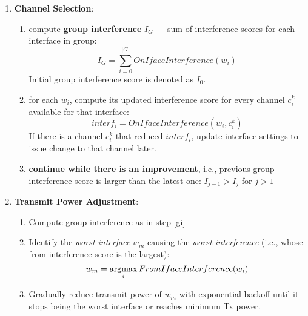 \begin{enumerate}
\item \textbf{Channel Selection}:
    \begin{enumerate}
        \item \label{gi} compute \textbf{group interference} $I_{G}$ --- sum of interference scores for each interface in group:
            \begin{equation}
                I_{G} = \sum_{i=0}^{\lvert G \rvert} OnIfaceInterference(w_i)
            \end{equation}
        Initial group interference score is denoted as $I_{0}$.
        \item for each $w_i$, compute its updated interference score for every channel $c^k_i$ available for that interface:
            \begin{equation}
                interf_i = OnIfaceInterference(w_i, c^k_i)
            \end{equation}
        If there is a channel $c^k_i$ that reduced $interf_i$, update interface settings to issue change to that channel later.
        \item \textbf{continue while there is an improvement}, i.e., previous group interference score is larger than the latest one:
        $I_{j-1} > I_{j}$ for $j > 1$
    \end{enumerate}
\item \textbf{Transmit Power Adjustment}:
    \begin{enumerate}
        \item Compute group interference as in step \ref{gi}
        \item Identify the \textit{worst interface} $w_m$ causing the \textit{worst interference} (i.e., whose from-interference score is the largest):
            \begin{equation}
                w_m = \operatorname*{argmax}_i FromIfaceInterference(w_i)
            \end{equation}
        \item Gradually reduce transmit power of $w_m$ with exponential backoff until it stops being the worst interface or reaches minimum Tx power.
    \end{enumerate}
\end{enumerate}

